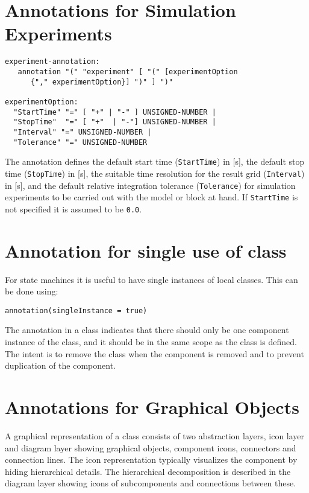 \section{Annotations for Simulation Experiments}\label{annotations-for-simulation-experiments}

\begin{lstlisting}[language=grammar]
experiment-annotation:
   annotation "(" "experiment" [ "(" [experimentOption
      {"," experimentOption}] ")" ] ")"

experimentOption:
  "StartTime" "=" [ "+" | "-" ] UNSIGNED-NUMBER |
  "StopTime"  "=" [ "+"  | "-"] UNSIGNED-NUMBER |
  "Interval" "=" UNSIGNED-NUMBER |
  "Tolerance" "=" UNSIGNED-NUMBER
\end{lstlisting}

The  annotation defines the default start time (\lstinline!StartTime!) in {[}s{]}, the default stop time (\lstinline!StopTime!) in {[}s{]}, the suitable time resolution for the result grid (\lstinline!Interval!) in {[}s{]}, and the default relative integration tolerance (\lstinline!Tolerance!) for simulation experiments to be carried out with the model or block at hand.
If \lstinline!StartTime! is not specified it is assumed to be \lstinline!0.0!.

\section{Annotation for single use of class}\label{annotation-for-single-use-of-class}

For state machines it is useful to have single instances of local classes.
This can be done using:
\begin{lstlisting}[language=modelica]
annotation(singleInstance = true)
\end{lstlisting}

The annotation  in a class indicates that there should only be one component instance of the class, and it should be in the same scope as the class is defined.
The intent is to remove the class when the component is removed and to prevent duplication of the component.

\section{Annotations for Graphical Objects}\label{annotations-for-graphical-objects}

A graphical representation of a class consists of two abstraction
layers, icon layer and diagram layer showing graphical objects,
component icons, connectors and connection lines. The icon
representation typically visualizes the component by hiding hierarchical
details. The hierarchical decomposition is described in the diagram
layer showing icons of subcomponents and connections between these.

